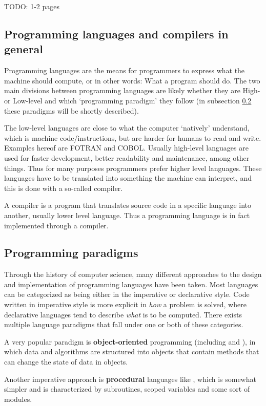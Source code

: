 TODO: 1-2 pages
\subsection{Programming languages and compilers in general}

Programming languages are the means for programmers to express what the machine should compute, or in other words: What a program should do.
The two main divisions between programming languages are likely whether they are High- or Low-level and which `programming paradigm' they follow (in subsection \ref{sec:paradigms} these paradigms will be shortly described).

The low-level languages are close to what the computer `natively' understand, which is machine code/instructions, but are harder for humans to read and write. Examples hereof are FOTRAN and COBOL. Usually high-level languages are used for faster development, better readability and maintenance, among other things. Thus for many purposes programmers prefer higher level languages. These languages have to be translated into something the machine can interpret, and this is done with a so-called compiler.

A compiler is a program that translates source code in a specific language into another, usually lower level language. Thus a programming language is in fact implemented through a compiler.

\subsection{Programming paradigms}
\label{sec:paradigms}
Through the history of computer science, many different approaches to the design and implementation of programming languages have been taken. Most languages can be categorized as being either in the imperative or declarative style. Code written in imperative style is more explicit in \emph{how} a problem is solved, where declarative languages tend to describe \emph{what} is to be computed. There exists multiple language paradigms that fall under one or both of these categories.

A very popular paradigm is \textbf{object-oriented} programming (including  and ), in which data and algorithms are structured into objects that contain methods that can change the state of data in objects.

Another imperative approach is \textbf{procedural} languages like , which is somewhat simpler and is characterized by subroutines, scoped variables and some sort of modules.

